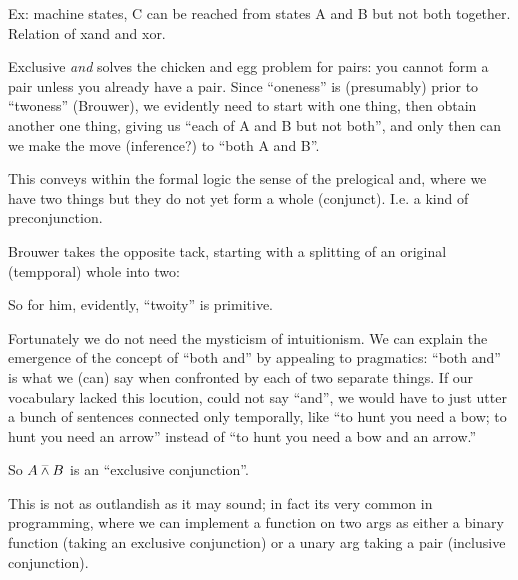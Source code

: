 \documentclass{article}
\begin{document}
Ex: machine states, C can be reached from states A and B but not both
together.  Relation of xand and xor.

Exclusive \textit{and} solves the chicken and egg problem for pairs:
you cannot form a pair unless you already have a pair. Since
``oneness'' is (presumably) prior to ``twoness'' (Brouwer), we
evidently need to start with one thing, then obtain another one thing,
giving us ``each of A and B but not both'', and only then can we make
the move (inference?) to ``both A and B''.

This conveys within the formal logic the sense of the prelogical and,
where we have two things but they do not yet form a whole (conjunct).
I.e. a kind of preconjunction.

Brouwer takes the opposite tack, starting with a splitting of an
original (tempporal) whole into two:


So for him, evidently, ``twoity'' is primitive.

Fortunately we do not need the mysticism of intuitionism. We can
explain the emergence of the concept of ``both and'' by appealing to
pragmatics: ``both and'' is what we (can) say when confronted by each
of two separate things. If our vocabulary lacked this locution, could
not say ``and'', we would have to just utter a bunch of sentences
connected only temporally, like ``to hunt you need a bow; to hunt you
need an arrow'' instead of ``to hunt you need a bow and an arrow.''

So \(A\barwedge B\) is an ``exclusive conjunction''.

This is not as outlandish as it may sound; in fact its very common in
programming, where we can implement a function on two args as either a
binary function (taking an exclusive conjunction) or a unary arg
taking a pair (inclusive conjunction).
\end{document}
